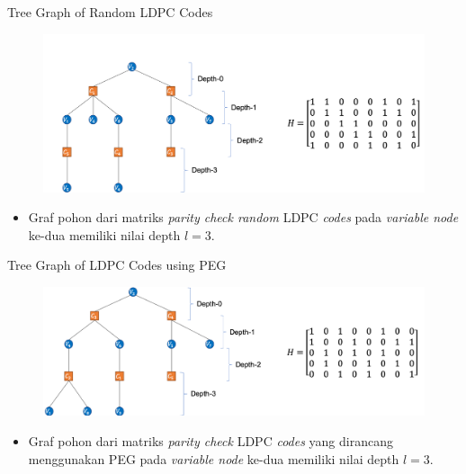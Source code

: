 \documentclass[11pt, aspectratio=169]{beamer}
\begin{document}
\begin{frame}{Tree Graph of Random LDPC Codes}
	\vspace{-1.25cm}
	\begin{figure}
		\centering 
		\includegraphics[scale=0.55]{gambarafa/kkk}
		\centering 
		
		
	\end{figure}
	\begin{itemize}
		\item Graf pohon dari matriks \textit{parity check random} LDPC \textit{codes} pada \textit{variable node} ke-dua memiliki nilai depth $l=3$. 
	\end{itemize}
	
	
	
	
\end{frame}


\begin{frame}{Tree Graph of LDPC Codes using PEG}
	\vspace{-0.5cm}
	\begin{figure}
		\centering 
		\includegraphics[scale=0.55]{gambarafa/withmatlabpeg}
		\centering 
		
		
	\end{figure}
	\begin{itemize}
		\item Graf pohon dari matriks \textit{parity check} LDPC \textit{codes} yang dirancang menggunakan PEG pada \textit{variable node} ke-dua memiliki nilai depth $l=3$. 
	\end{itemize}
	
	
	
	
\end{frame}
\end{document}
